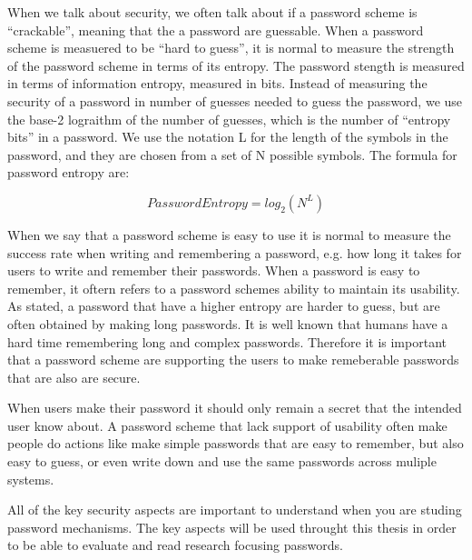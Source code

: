     When we talk about security, we often talk about if a password scheme is ``crackable'', meaning that the a password are guessable. When a password scheme is measuered to be ``hard to guess'', it is normal to measure the strength of the password scheme in terms of its entropy. The password stength is measured in terms of information entropy, measured in bits. Instead of measuring the security of a password in number of guesses needed to guess the password, we use the base-2 lograithm of the number of guesses, which is the number of ``entropy bits'' in a password. We use the notation L for the length of the symbols in the password, and they are chosen from a set of N possible symbols. The formula for password entropy are:

      \begin{equation}
        Password Entropy = log_{2}(N^{L})
      \end{equation}

    When we say that a password scheme is easy to use it is normal to measure the success rate when writing and remembering a password, e.g. how long it takes for users to write and remember their passwords. When a password is easy to remember, it oftern refers to a password schemes ability to maintain its usability. As stated, a password that have a higher entropy are harder to guess, but are often obtained by making long passwords. It is well known that humans have a hard time remembering long and complex passwords. Therefore it is important that a password scheme are supporting the users to make remeberable passwords that are also are secure. 

    When users make their password it should only remain a secret that the intended user know about. A password scheme that lack support of usability often make people do actions like make simple passwords that are easy to remember, but also easy to guess, or even write down and use the same passwords across muliple systems. 

    All of the key security aspects are important to understand when you are studing password mechanisms. The key aspects will be used throught this thesis in order to be able to evaluate and read research focusing passwords. 




